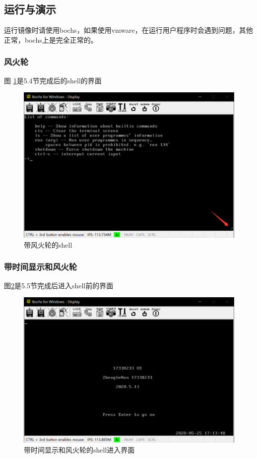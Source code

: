 \documentclass[a4paper, 11pt]{article} %
\begin{document}
\subsection{运行与演示}

运行镜像时请使用bochs，如果使用vmware，在运行用户程序时会遇到问题，其他正常，bochs上是完全正常的。
\subsubsection{风火轮}
图 \ref{fig:sheel}是5.4节完成后的shell的界面
\begin{figure}[H]
  \centering
  \includegraphics[width=0.8\linewidth]{shell.png}
  \caption{带风火轮的shell}
  \label{fig:sheel}
\end{figure}


\subsubsection{带时间显示和风火轮}

图\ref{fig:wheelentr}是5.5节完成后进入shell前的界面
\begin{figure}[H]
  \centering
  \includegraphics[width=0.8\linewidth]{entrWithDate.png}
  \caption{带时间显示和风火轮的shell进入界面}
  \label{fig:wheelentr}
\end{figure}
\end{document}
